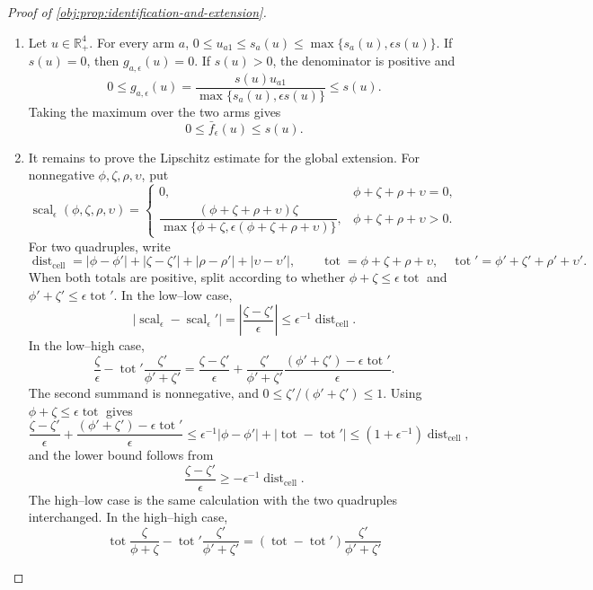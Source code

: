 \documentclass[11pt]{article}
\begin{document}
\begin{proof}[Proof of \cref{obj:prop:identification-and-extension}]
\begin{enumerate}
\item Let \(u\in\mathbb R_+^4\).  For every arm \(a\),
\(0\le u_{a1}\le s_a(u)\le \max\{s_a(u),\epsilon s(u)\}\).  If \(s(u)=0\), then
\(g_{a,\epsilon}(u)=0\).  If \(s(u)>0\), the denominator is positive and
\[
0\le g_{a,\epsilon}(u)
=\frac{s(u)u_{a1}}{\max\{s_a(u),\epsilon s(u)\}}
\le s(u).
\]
Taking the maximum over the two arms gives
\[
0\le \bar f_\epsilon(u)\le s(u).
\] %

\item It remains to prove the Lipschitz estimate for the global extension.  For nonnegative
\(\phi,\zeta,\rho,\upsilon\), put
\[
\operatorname{scal}_{\epsilon}(\phi,\zeta,\rho,\upsilon)=
\begin{cases}
0, & \phi+\zeta+\rho+\upsilon=0,\\[2mm]
\dfrac{(\phi+\zeta+\rho+\upsilon)\zeta}
{\max\{\phi+\zeta,\epsilon(\phi+\zeta+\rho+\upsilon)\}},
& \phi+\zeta+\rho+\upsilon>0 .
\end{cases}
\]
For two quadruples, write
\[
\operatorname{dist}_{\mathrm{cell}}
=
|\phi-\phi'|+|\zeta-\zeta'|+|\rho-\rho'|+|\upsilon-\upsilon'|,
\qquad
\operatorname{tot}=\phi+\zeta+\rho+\upsilon,
\quad
\operatorname{tot}'=\phi'+\zeta'+\rho'+\upsilon'.
\]
When both totals are positive, split according to whether
\(\phi+\zeta\le \epsilon\operatorname{tot}\) and
\(\phi'+\zeta'\le \epsilon\operatorname{tot}'\).  In the low--low case,
\[
|\operatorname{scal}_{\epsilon}-\operatorname{scal}_{\epsilon}'|
=\left|\frac{\zeta-\zeta'}{\epsilon}\right|
\le \epsilon^{-1}\operatorname{dist}_{\mathrm{cell}}.
\]
In the low--high case,
\[
\frac{\zeta}{\epsilon}
-\operatorname{tot}'\frac{\zeta'}{\phi'+\zeta'}
=
\frac{\zeta-\zeta'}{\epsilon}
+\frac{\zeta'}{\phi'+\zeta'}
  \frac{(\phi'+\zeta')-\epsilon\operatorname{tot}'}{\epsilon}.
\]
The second summand is nonnegative, and \(0\le \zeta'/(\phi'+\zeta')\le 1\).  Using
\(\phi+\zeta\le \epsilon\operatorname{tot}\) gives
\[
\frac{\zeta-\zeta'}{\epsilon}
+\frac{(\phi'+\zeta')-\epsilon\operatorname{tot}'}{\epsilon}
\le
\epsilon^{-1}|\phi-\phi'|+|\operatorname{tot}-\operatorname{tot}'|
\le (1+\epsilon^{-1})\operatorname{dist}_{\mathrm{cell}},
\]
and the lower bound follows from
\[
\frac{\zeta-\zeta'}{\epsilon}\ge
-\epsilon^{-1}\operatorname{dist}_{\mathrm{cell}}.
\]
The high--low case is the same calculation with the two quadruples interchanged.  In the high--high
case,
\[
\operatorname{tot}\frac{\zeta}{\phi+\zeta}
-\operatorname{tot}'\frac{\zeta'}{\phi'+\zeta'}
=
(\operatorname{tot}-\operatorname{tot}')\frac{\zeta'}{\phi'+\zeta'}
\]
\end{enumerate}
\end{proof}
\end{document}
